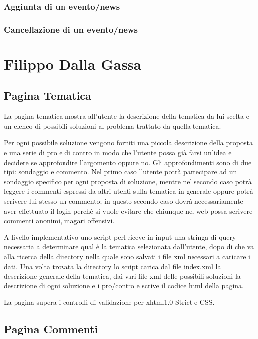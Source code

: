 \documentclass[a4paper,10pt]{article}
\begin{document}
\subsubsection{Aggiunta di un evento/news}
\subsubsection{Cancellazione di un evento/news}

\section{Filippo Dalla Gassa}

\subsection{Pagina Tematica}

La pagina tematica mostra all'utente la descrizione della tematica da lui scelta e un elenco di possibili soluzioni al problema trattato da quella tematica.

Per ogni possibile soluzione vengono forniti una piccola descrizione della proposta e una serie di pro e di contro in modo che l'utente possa gi\`a farsi un'idea e decidere se approfondire l'argomento oppure no. Gli approfondimenti sono di due tipi: sondaggio e commento. Nel primo caso l'utente potr\`a partecipare ad un sondaggio specifico per ogni proposta di soluzione, mentre nel secondo caso potr\`a leggere i commenti espressi da altri utenti sulla tematica in generale oppure potr\`a scrivere lui stesso un commento; in questo secondo caso dovr\`a necessariamente aver effettuato il login perch\`e si vuole evitare che chiunque nel web possa scrivere commenti anonimi, magari offensivi.

A livello implementativo uno script perl riceve in input una stringa di query necessaria a determinare qual \`e la tematica selezionata dall'utente, dopo di che va alla ricerca della directory nella quale sono salvati i file xml necessari a caricare i dati. Una volta trovata la directory lo script carica dal file index.xml la descrizione generale della tematica, dai vari file xml delle possibili soluzioni la descrizione di ogni soluzione e i pro/contro e scrive il codice html della pagina.

La pagina supera i controlli di validazione per xhtml1.0 Strict e CSS.


\subsection{Pagina Commenti}
\end{document}
